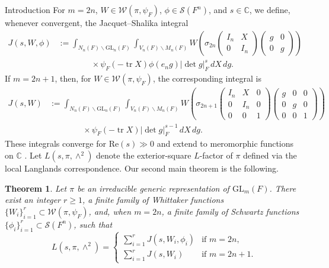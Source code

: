 \documentclass[12pt,reqno]{amsart}
\numberwithin{equation}{section}%
\numberwithin{equation}{subsection}
\newtheorem{thm}[equation]{Theorem}%
\theoremstyle{definition}
\theoremstyle{remark}
\begin{document}
\begin{section}{Introduction}
For \(m=2n\), \(W\in\mathcal{W}(\pi,\psi_F)\),
\(\phi\in\mathcal{S}(F^n)\), and $s\in\mathbb{C}$, we define,
whenever convergent, the Jacquet--Shalika integral
\cite{JS1990} 
\[
\begin{aligned}
  J(s,W,\phi)
  &:=
  \int_{N_n(F)\backslash\mathrm{GL}_n(F)}
  \int_{V_n(F)\backslash M_n(F)}
  W\left(
    \sigma_{2n}
    \begin{pmatrix}
      I_n & X\\
      0   & I_n
    \end{pmatrix}
    \begin{pmatrix}
      g & 0\\
      0 & g
    \end{pmatrix}
  \right) \\
  &\qquad\qquad\times
  \psi_F(-\operatorname{tr}X)\phi(e_ng)
  |\det g|_F^s\,dX\,dg.
\end{aligned}
\]
If \(m=2n+1\), then, for \(W\in\mathcal{W}(\pi,\psi_F)\), the
corresponding integral is
\[
\begin{aligned}
  J(s,W)
  &:=
  \int_{N_n(F)\backslash\mathrm{GL}_n(F)}
  \int_{V_n(F)\backslash M_n(F)}
  W\left(
    \sigma_{2n+1}
    \begin{pmatrix}
      I_n & X   & 0\\
      0   & I_n & 0\\
      0   & 0   & 1
    \end{pmatrix}
    \begin{pmatrix}
      g & 0 & 0\\
      0 & g & 0\\
      0 & 0 & 1
    \end{pmatrix}
  \right) \\
  &\qquad\qquad\times
  \psi_F(-\operatorname{tr}X)|\det g|_F^{s-1}\,dX\,dg.
\end{aligned}
\]
These integrals converge for \(\mathrm{Re}(s) \gg 0\) and extend to meromorphic functions on $\mathbb{C}$ \cite{JS1990, Bel2011,JLST2025}.
Let $L(s,\pi,\wedge^2)$ denote the exterior-square $L$-factor of $\pi$ defined via the local Langlands correspondence. Our second main theorem is the following.

\begin{thm}\label{main2}
Let \(\pi\) be an irreducible generic representation of
\(\mathrm{GL}_m(F)\). There exist an integer \(r\geq 1\), a finite
family of Whittaker functions
\(\{W_i\}_{i=1}^r\subset\mathcal{W}(\pi,\psi_F)\), and, when
\(m=2n\), a finite family of Schwartz functions
\(\{\phi_i\}_{i=1}^r\subset\mathcal{S}(F^n)\), such that
\[
L(s,\pi,\wedge^2)=
\begin{cases}
\displaystyle\sum_{i=1}^r J(s,W_i,\phi_i)
  & \text{if } m=2n,\\[6pt]
\displaystyle\sum_{i=1}^r J(s,W_i)
  & \text{if } m=2n+1.
\end{cases}
\]
\end{thm}


\end{section}
\end{document}
